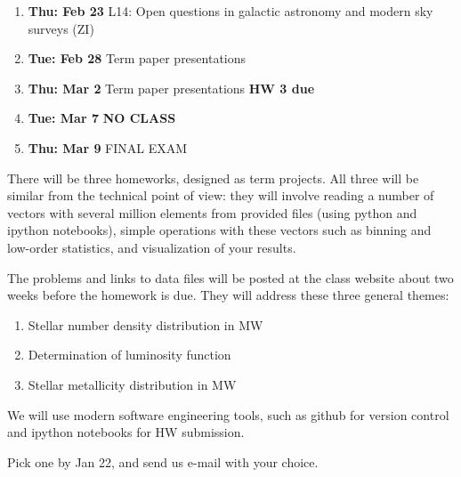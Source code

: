 \documentclass[10pt]{article}
\begin{document}
\begin{enumerate}
  \item {\bf Thu: Feb 23}  L14: Open questions in galactic astronomy and modern sky surveys (ZI)
  \item {\bf Tue: Feb 28}  Term paper presentations
  \item {\bf Thu: Mar  2}  Term paper presentations {\bf HW 3 due}
  \item {\bf Tue: Mar  7}  {\bf NO CLASS}
  \item {\bf Thu: Mar 9}   FINAL EXAM
\end{enumerate}


\vskip 0.2in


There will be three homeworks, designed as term projects. All three will be similar
from the technical point of view: they will involve reading a number of vectors with several 
million elements from provided files (using python and ipython notebooks), simple operations 
with these vectors such as binning and low-order statistics, and visualization of your results. 

The problems and links to data files will be posted at the class website about two weeks 
before the homework is due. They will address these three general themes:

\begin{enumerate}
\item Stellar number density distribution in MW
\item Determination of luminosity function 
\item Stellar metallicity distribution in MW  
\end{enumerate}

We will use modern software engineering tools, such as github for version control and ipython 
notebooks for HW submission. 

\vskip 0.2in

 Pick one by Jan 22, and send
us e-mail with your choice.
\end{document}
